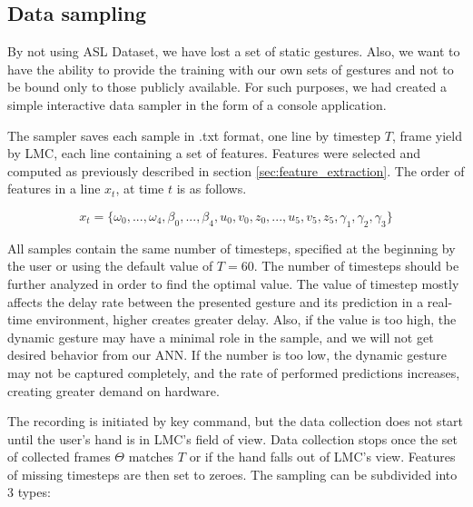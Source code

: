\subsection{Data sampling}
\label{data_sampling}
By not using ASL Dataset, we have lost a set of static gestures. Also, we want to have the ability to provide the training with our own sets of gestures and not to be bound only to those publicly available. For such purposes, we had created a simple interactive data sampler in the form of a console application.

The sampler saves each sample in .txt format, one line by timestep $T$, frame yield by LMC, each line containing a set of features. Features were selected and computed as previously described in section \ref{sec:feature_extraction}. The order of features in a line $x_t$, at time $t$ is as follows.


\begin{equation}
    {x_t = \{\omega_0, ...,\omega_4, \beta_0, ..., \beta_4, u_0,v_0,z_0, ..., u_5,v_5,z_5, \gamma_1, \gamma_2, \gamma_3\}}
\end{equation}

All samples contain the same number of timesteps, specified at the beginning by the user or using the default value of $T=60$. The number of timesteps should be further analyzed in order to find the optimal value. The value of timestep mostly affects the delay rate between the presented gesture and its prediction in a real-time environment, higher creates greater delay. Also, if the value is too high, the dynamic gesture may have a minimal role in the sample, and we will not get desired behavior from our ANN. If the number is too low, the dynamic gesture may not be captured completely, and the rate of performed predictions increases, creating greater demand on hardware. 

The recording is initiated by key command, but the data collection does not start until the user's hand is in LMC's field of view. Data collection stops once the set of collected frames $\Theta$ matches $T$ or if the hand falls out of LMC's view. Features of missing timesteps are then set to zeroes. The sampling can be subdivided into 3 types:

